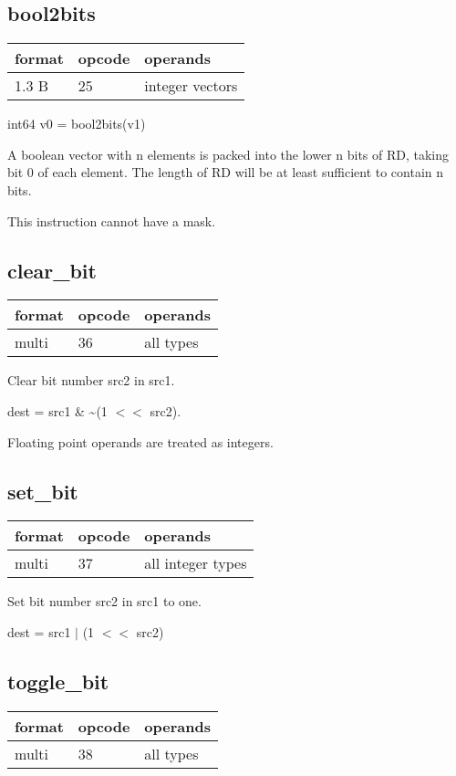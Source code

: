 \documentclass[forwardcom.tex]{subfiles}
\begin{document}
\subsection{bool2bits}
\label{table:bool2bitsInstruction}
\begin{tabular}{|p{12mm}|p{15mm}|p{100mm}|}
\hline
\bfseries format & \bfseries opcode & \bfseries operands \\ \hline
1.3 B & 25 & integer vectors \\ \hline
\end{tabular}
\vv

int64 v0 = bool2bits(v1)
\vv

A boolean vector with n elements is packed into the lower n bits of RD, taking bit 0 of each element. 
The length of RD will be at least sufficient to contain n bits.
\vv

This instruction cannot have a mask.
\vv


\subsection{clear\_bit}
\label{table:clearBitInstruction}
\begin{tabular}{|p{12mm}|p{15mm}|p{100mm}|}
\hline
\bfseries format & \bfseries opcode & \bfseries operands \\ \hline
multi & 36 & all types \\ \hline
\end{tabular}
\vv

Clear bit number src2 in src1.
\vv

dest = src1 \& \~{}(1 $<<$ src2).

\vv
Floating point operands are treated as integers.
\vv


\subsection{set\_bit}
\label{table:setBitInstruction}
\begin{tabular}{|p{12mm}|p{15mm}|p{100mm}|}
\hline
\bfseries format & \bfseries opcode & \bfseries operands \\ \hline
multi & 37 & all integer types \\ \hline
\end{tabular}
\vv

Set bit number src2 in src1 to one.
\vv

dest = src1 $|$ (1 $<<$ src2)
\vv


\subsection{toggle\_bit}
\label{table:toggleBitInstruction}
\begin{tabular}{|p{12mm}|p{15mm}|p{100mm}|}
\hline
\bfseries format & \bfseries opcode & \bfseries operands \\ \hline
multi & 38 & all types \\ \hline
\end{tabular}
\vv
\end{document}
